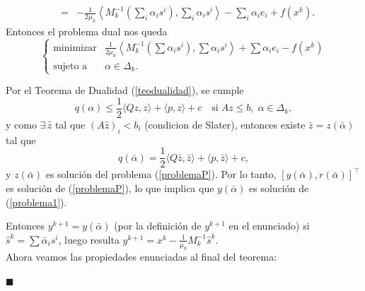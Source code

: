 \documentclass[a4paper,12pt]{report}
\newcommand{\la}{\langle}
\newcommand{\ra}{\rangle}
\newcommand{\lla}{\left\la}
\newcommand{\rra}{\right\ra}
\newenvironment{dem}{\vspace*{-0.1cm}{\it Demostraci\'on:}}{\hfill
$\blacksquare$\\}
\begin{document}
\begin{dem}
\begin{eqnarray*}
&=&\textstyle-\frac{1}{2\mu_k}\left\la M_k^{-1}\left(\sum_{i} \alpha_i s^i\right),\sum_{i}\alpha_i s^i\right\ra -\sum_i \alpha_i e_i+f(x^k).
\end{eqnarray*}
Entonces el problema dual nos queda
\begin{equation}\label{problemaD}
\left\{
 \begin{array}{rl}
  \mathop{\mathrm{minimizar}}& \frac{1}{2\mu_k}\lla M_k^{-1}\left(\sum \alpha_i s^i\right),\sum \alpha_i s^i\rra+\sum \alpha_i e_i-f(x^k)\\
  \mbox{sujeto a}& \alpha\in\Delta_k.
 \end{array}
\right.
\end{equation}

Por el Teorema de Dualidad (\ref{teodualidad}), se cumple
$$q(\alpha)\leq\frac{1}{2}\la Qz,z\ra+\la p,z\ra+c\quad\mbox{si}\;Az\leq b,\;\alpha\in\Delta_k,$$
y como $\exists\, \hat{z}$ tal que $(A\hat{z})_i<b_i$ (condicion de Slater),
entonces existe $\bar{z}=z(\bar{\alpha})$ tal que 
$$q(\bar{\alpha})= \frac{1}{2} \la Q\bar{z},\bar{z}\ra+\la p,\bar{z}\ra + c,$$ y $z(\bar{\alpha})$ es soluci\'on del problema (\ref{problemaP}). Por lo tanto, $[y(\bar{\alpha}),r(\bar{\alpha})]^\top$ es soluci\'on de (\ref{problemaP}), lo que implica que $y(\bar{\alpha})$ es soluci\'on de (\ref{problema1}).

Entonces $y^{k+1}=y(\bar\alpha)$ (por la definici\'on de $y^{k+1}$ en el enunciado) si $\hat{s}^k=\sum \bar{\alpha}_i s^i$, luego resulta $y^{k+1}=x^k-\frac{1}{\mu_k}M_k^{-1}\hat{s}^k.$\\


Ahora veamos las propiedades enunciadas al final del teorema:


\end{dem}
\end{document}
